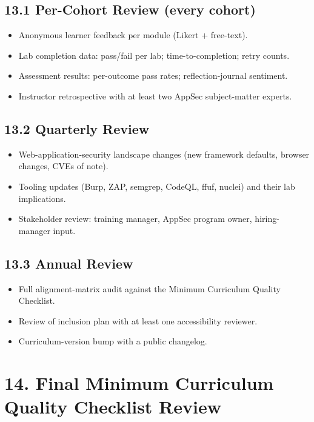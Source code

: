 \documentclass[11pt,letterpaper,oneside]{report}
\begin{document}
\subsection*{13.1 Per-Cohort Review (every cohort)}
\begin{itemize}
  \item Anonymous learner feedback per module (Likert + free-text).
  \item Lab completion data: pass/fail per lab; time-to-completion; retry counts.
  \item Assessment results: per-outcome pass rates; reflection-journal sentiment.
  \item Instructor retrospective with at least two AppSec subject-matter experts.
\end{itemize}

\subsection*{13.2 Quarterly Review}
\begin{itemize}
  \item Web-application-security landscape changes (new framework defaults, browser changes, CVEs of note).
  \item Tooling updates (Burp, ZAP, semgrep, CodeQL, ffuf, nuclei) and their lab implications.
  \item Stakeholder review: training manager, AppSec program owner, hiring-manager input.
\end{itemize}

\subsection*{13.3 Annual Review}
\begin{itemize}
  \item Full alignment-matrix audit against the Minimum Curriculum Quality Checklist.
  \item Review of inclusion plan with at least one accessibility reviewer.
  \item Curriculum-version bump with a public changelog.
\end{itemize}

\section*{14. Final Minimum Curriculum Quality Checklist Review}
\end{document}
